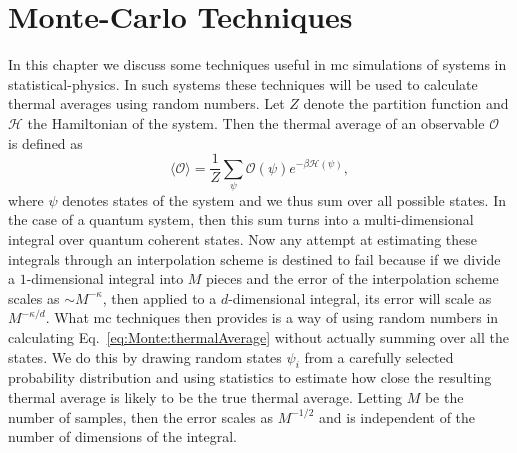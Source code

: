 \chapter{Monte-Carlo Techniques}
\label{chap:Monte}
%
\noindent In this chapter we discuss some techniques useful in \ac{mc} simulations
of systems in statistical-physics.
In such systems these techniques will be used to calculate thermal averages using random numbers. Let
$Z$ denote the partition function and $\mathcal{H}$ the Hamiltonian of the system. Then the thermal
average of an observable $\mathcal{O}$ is defined as
\begin{equation}
    \label{eq:Monte:thermalAverage}
    \langle\mathcal{O}\rangle = \frac{1}{Z}\sum_\psi\mathcal{O}(\psi)e^{-\beta\mathcal{H}(\psi)},
\end{equation}
where $\psi$ denotes states of the system and we thus sum over all possible states. In the case of
a quantum system, then this sum turns into a multi-dimensional integral over quantum coherent states.
Now any attempt at estimating these integrals through an interpolation scheme is destined to fail because if we divide
a $1$-dimensional integral into $M$ pieces and the error of the interpolation scheme scales as $\sim M^{-\kappa}$,
then applied to a $d$-dimensional integral, its error will scale as $M^{-\kappa/d}$.
What \ac{mc} techniques then provides is a way of using random numbers in calculating
Eq.~\eqref{eq:Monte:thermalAverage} without actually summing over all the states. We do this by drawing random states
$\psi_i$ from a carefully selected probability distribution and using statistics to estimate how close the resulting
thermal average is likely to be the true thermal average. Letting $M$ be the number of samples, then the
error scales as $M^{-1/2}$ and is independent of the number of dimensions of the integral.

